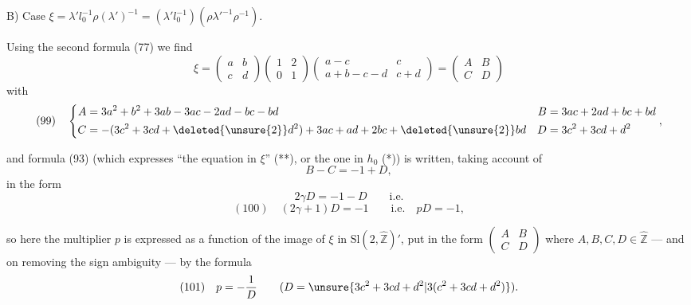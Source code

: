 B) Case $\xi=\lambda'l_0^{-1}\rho(\lambda')^{-1}=(\lambda'l_0^{-1})(\rho\lambda'^{-1}\rho^{-1})$.

Using the second formula (77) we find
\[
\xi=\begin{pmatrix}a&b\\c&d\end{pmatrix}
\begin{pmatrix}1&2\\0&1\end{pmatrix}
\begin{pmatrix}a-c&c\\a+b-c-d&c+d\end{pmatrix}
=\begin{pmatrix}A&B\\C&D\end{pmatrix}
\]
with
\[
(99)\quad
\left\{\begin{aligned}
A&=3a^2+b^2+3ab-3ac-2ad-bc-bd
& B&=3ac+2ad+bc+bd\\
C&=-(3c^2+3cd+\deleted{\unsure{2}}d^2)+3ac+ad+2bc+\deleted{\unsure{2}}bd
& D&=3c^2+3cd+d^2
\end{aligned}\right.,
\]

and formula (93) (which expresses ``the equation in $\xi$'' (**), or the one in $h_0$ (*)) is written,  taking account of
\[
B-C=-1+D,
\]
in the form \deleted{\unsure{$2\gamma$}}
\[
2\gamma D=-1-D\qquad\text{i.e.}
\]
\[
(100)\quad \boxed{(2\gamma+1)D=-1\qquad\text{i.e.}\quad pD=-1},
\]

so here the multiplier $p$ is expressed as a function of the image of $\xi$ in $\mathrm{Sl}(2,\widehat{\mathbb Z})'$, put in the form $\begin{pmatrix}A&B\\C&D\end{pmatrix}$ where $A,B,C,D\in\widehat{\mathbb Z}$ --- and on removing the sign ambiguity  --- by the formula
\[
(101)\quad p=-\frac1D\qquad(D=\unsure{3c^2+3cd+d^2|3(c^2+3cd+d^2)}).
\]